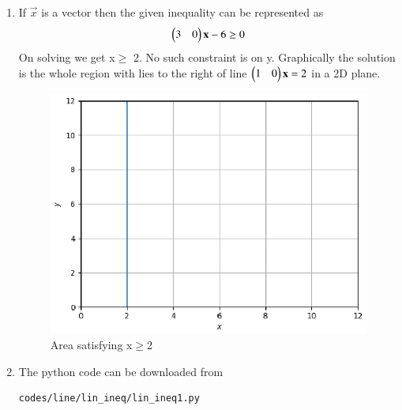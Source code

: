 \renewcommand{\theequation}{\theenumi}
\begin{enumerate}[label=\thesection.\arabic*.,ref=\thesection.\theenumi]

\item If $\vec{x}$ is a vector then the given inequality can be represented as 
\begin{align}
\begin{pmatrix}3&0\end{pmatrix}\mathbf{x} - 6 \geq 0
\end{align}
On solving we get x$\geq$ 2. No such constraint is on y. Graphically the solution is the whole region with lies to the right of line $\begin{pmatrix}1&0\end{pmatrix}\mathbf{x}=2$ in a 2D plane.

\begin{figure}[!ht]
\centering
\includegraphics[width= \columnwidth]{./figs/line/lin_ineq/lin_ineq.eps}
\caption{Area satisfying x$\geq$2}
\end{figure}
\item The python code can be downloaded from
\begin{lstlisting}
codes/line/lin_ineq/lin_ineq1.py
\end{lstlisting}
\end{enumerate}